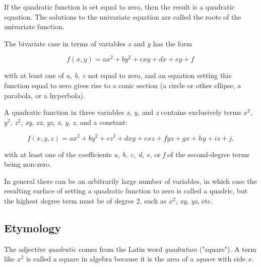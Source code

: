 If the quadratic function is set equal to zero, then the result is a quadratic equation.
The solutions to the univariate equation are called the roots of the univariate function.



The bivariate case in terms of variables \textit{x} and \textit{y} has the form



$$f(x,y) = a x^2 + by^2 + cx y+ d x+ ey + f \,$$



with at least one of \textit{a, b, c} not equal to zero, and an equation setting this
function equal to zero gives rise to a conic section (a circle or other ellipse, a
parabola, or a hyperbola).



A quadratic function in three variables \textit{x}, \textit{y,} and \textit{z} contains
exclusively terms $x^2$, $y^2$, $z^2$, \textit{xy}, \textit{xz}, \textit{yz}, \textit{x},
\textit{y}, \textit{z}, and a constant:



$$f(x,y,z)=ax^2+by^2+cz^2+dxy+exz+fyz+gx+hy+iz +j,$$



with at least one of the coefficients \textit{a, b, c, d, e,} or \textit{f} of the
second-degree terms being non-zero.



In general there can be an arbitrarily large number of variables, in which case the
resulting surface of setting a quadratic function to zero is called a quadric, but the
highest degree term must be of degree 2, such as $x^2$, \textit{xy}, \textit{yz}, etc.




\subsection{Etymology}
\label{sss:etym-a4f6}




The adjective \textit{quadratic} comes from the Latin word \textit{quadratum} ("square").
A term like $x^2$ is called a square in algebra because it is the area of a
\textit{square} with side $x$.





